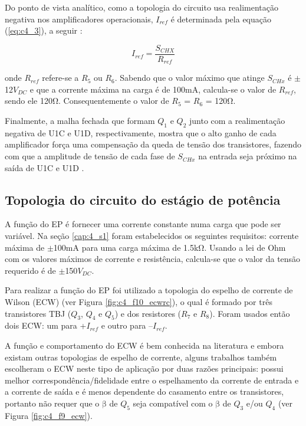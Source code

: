 Do ponto de vista analítico, como a topologia do circuito usa realimentação negativa nos amplificadores operacionais, $I_{ref}$ é determinada pela equação (\ref{eq:c4_3}), a seguir \cite{Kaczmarek1991}:

\begin{equation}
    I_{ref} = \frac{S_{CHX}}{R_{ref}}
    \label{eq:c4_3}
\end{equation}

onde $R_{ref}$ refere-se a $R_5$ ou $R_6$. Sabendo que o valor máximo que atinge $S_{CHx}$ é $\mathrm{\pm}$12$V_{DC}$ e que a corrente máxima na carga é de 100mA, calcula-se o valor de $R_{ref}$, sendo ele 120$\mathrm{\Omega}$. Consequentemente o valor de $R_5$ = $R_6$ = 120$\mathrm{\Omega}$.

Finalmente, a malha fechada que formam $Q_1$ e $Q_2$ junto com a realimentação negativa de U1C e U1D, respectivamente, mostra que o alto ganho de cada amplificador força uma compensação da queda de tensão dos transistores, fazendo com que a amplitude de tensão de cada fase de $S_{CHx}$ na entrada seja próximo na saída de U1C e U1D \cite{Kaczmarek1991}.


\subsection*{Topologia do circuito do estágio de potência} 
A função do \acrshort{EP} é fornecer uma corrente constante numa carga que pode ser variável. Na seção \ref{cap:4_s1} foram estabelecidos os seguintes requisitos: corrente máxima de $\mathrm{\pm}$100mA para uma carga máxima de 1.5k$\mathrm{\Omega}$. Usando a lei de Ohm com os valores máximos de corrente e resistência, calcula-se que o valor da tensão requerido é de $\mathrm{\pm}$150$V_{DC}$.

Para realizar a função do \acrshort{EP} foi utilizado a topologia do espelho de corrente de Wilson (\acrshort{ECW}) (ver Figura \ref{fig:c4_f10_ecwrc}), o qual é formado por três transistores \acrshort{TBJ} ($Q_3$, $Q_4$ e $Q_5$) e dos resistores ($R_7$ e $R_8$). Foram usados então dois \acrshort{ECW}: um para +$I_{ref}$ e outro para –$I_{ref}$. 

A função e comportamento do \acrshort{ECW} é bem conhecida na literatura \cite{Boylestad2013} e embora existam outras topologias de espelho de corrente, alguns trabalhos \cite{Kaczmarek1991, Wu2002, Sanches2013} também escolheram o \acrshort{ECW} neste tipo de aplicação por duas razões principais: possui melhor correspondência/fidelidade entre o espelhamento da corrente de entrada e a corrente de saída e é menos dependente do casamento entre os transistores, portanto não requer que o $\mathrm{\beta}$ de $Q_5$ seja compatível com o $\mathrm{\beta}$ de $Q_3$ e/ou $Q_4$ (ver Figura \ref{fig:c4_f9_ecw}).

